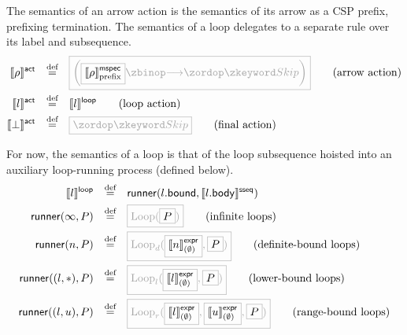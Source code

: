 \begin{definition}[\msequenceaction]

The semantics of an arrow action is the semantics of its arrow as a CSP prefix,
prefixing termination.  The semantics of a loop delegates to a separate rule
over its label and subsequence.
%
\begin{align*}
	\actsema{\anarrow}
\quad\defeq\quad&
	\tlang{
	\left(
	\olang{\pmspecsema{\anarrow}}
	\then
	\Skip
	\right)
	}
	\tag{arrow action}
\\
	\actsema{\aloop}
\quad\defeq\quad&
	\loopsema{\aloop}
\tag{loop action}
\\
	\actsema{\bot}
\quad\defeq\quad&
	\tlang{\Skip}
\tag{final action}
\end{align*}

\end{definition}

\newcommand{\iloop}[1]{\text{Loop}(#1)}
\newcommand{\nloop}[1]{\text{Loop}_\sqcap(#1)}
\newcommand{\dloop}[2]{\text{Loop}_d(#1, #2)}
\newcommand{\lloop}[2]{\text{Loop}_l(#1, #2)}
\newcommand{\uloop}[2]{\text{Loop}_u(#1, #2)}
\newcommand{\rloop}[3]{\text{Loop}_r(#1, #2, #3)}

\begin{definition}[\mloopstep]  
For now, the semantics of a loop is that of the loop
subsequence hoisted into an auxiliary loop-running process (defined
below).
%
\begin{align*}
  \loopsema{\aloop}
  \quad\defeq\quad
  &
    \funcname{runner}(\field{\aloop}{bound}, \sseqsema{\field{\aloop}{body}})
  \\
  \funcname{runner}(\infty, P)
  \quad\defeq\quad
  & \tlang{\iloop{\olang{P}}}
    \tag{infinite loops}
  \\
  \funcname{runner}(n, P)
  \quad\defeq\quad
  & \tlang{\dloop{\olang{\exprsema{n}{\emptyset}}}{\olang{P}}}
    \tag{definite-bound loops}
  \\
  \funcname{runner}((l, \ast), P)
  \quad\defeq\quad
  & \tlang{\lloop{\olang{\exprsema{l}{\emptyset}}}{\olang{P}}}
    \tag{lower-bound loops}
  \\
  \funcname{runner}((l, u), P)
  \quad\defeq\quad
  & \tlang{\rloop{\olang{\exprsema{l}{\emptyset}}}{\olang{\exprsema{u}{\emptyset}}}{\olang{P}}}
    \tag{range-bound loops}
  \\  
\end{align*}

\end{definition}

